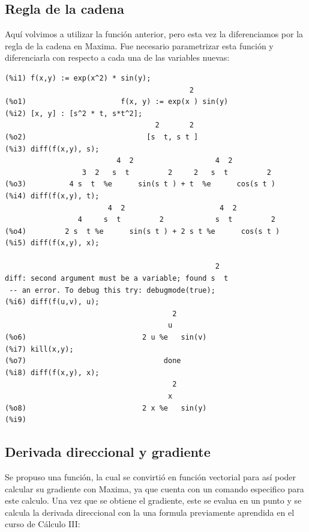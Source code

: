 \documentclass[12pt,letterpaper]{article}
\begin{document}
\subsection{Regla de la cadena}
Aquí volvimos a utilizar la función anterior, pero esta vez la diferenciamos por la regla de la cadena en Maxima. Fue necesario parametrizar esta función y diferenciarla con respecto a cada una de las variables nuevas: 

\begin{verbatim}
(%i1) f(x,y) := exp(x^2) * sin(y);
                                           2
(%o1)                      f(x, y) := exp(x ) sin(y)
(%i2) [x, y] : [s^2 * t, s*t^2];
                                   2       2
(%o2)                            [s  t, s t ]
(%i3) diff(f(x,y), s);
                          4  2                   4  2
                  3  2   s  t         2     2   s  t         2
(%o3)          4 s  t  %e      sin(s t ) + t  %e      cos(s t )
(%i4) diff(f(x,y), t);
                        4  2                      4  2
                 4     s  t         2            s  t         2
(%o4)         2 s  t %e      sin(s t ) + 2 s t %e      cos(s t )
(%i5) diff(f(x,y), x);

                                                 2
diff: second argument must be a variable; found s  t
 -- an error. To debug this try: debugmode(true);
(%i6) diff(f(u,v), u);
                                       2
                                      u
(%o6)                           2 u %e   sin(v)
(%i7) kill(x,y);
(%o7)                                done
(%i8) diff(f(x,y), x);
                                       2
                                      x
(%o8)                           2 x %e   sin(y)
(%i9) 
\end{verbatim}

\subsection{Derivada direccional y gradiente}
Se propuso una función, la cual se convirtió en función vectorial para así poder calcular su gradiente con Maxima, ya que cuenta con un comando especifico para este calculo. Una vez que se obtiene el gradiente, este se evalua en un punto y se calcula la derivada direccional con la una formula previamente aprendida en el curso de Cálculo III:
\end{document}
